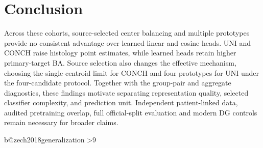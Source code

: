 \section{Conclusion}
\label{sec:conclusion}
Across these cohorts, source-selected center balancing and multiple prototypes provide no consistent advantage over learned linear and cosine heads. UNI and CONCH raise histology point estimates, while learned heads retain higher primary-target BA. Source selection also changes the effective mechanism, choosing the single-centroid limit for CONCH and four prototypes for UNI under the four-candidate protocol. Together with the group-pair and aggregate diagnostics, these findings motivate separating representation quality, selected classifier complexity, and prediction unit. Independent patient-linked data, audited pretraining overlap, full official-split evaluation and modern DG controls remain necessary for broader claims.

\clearpage
\ifcsname b@zech2018generalization\endcsname
\ifnum\value{page}>9\relax
  \PackageError{paperlength}{Technical content exceeds eight pages (currently \the\numexpr\value{page}-1\relax)}{Shorten the technical content before submission.}
\fi
\fi
